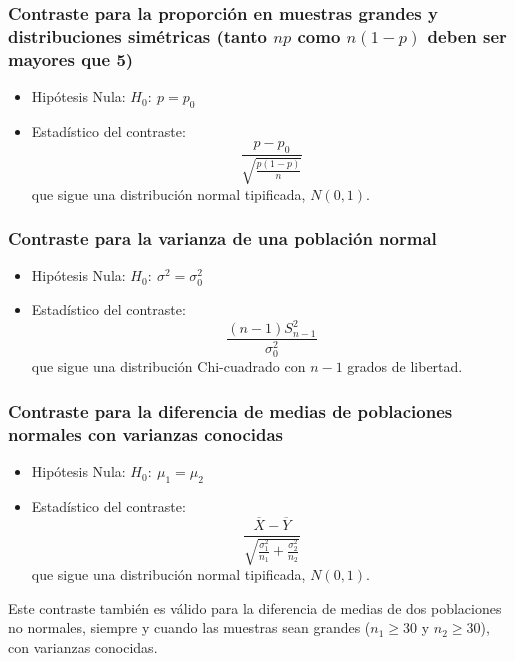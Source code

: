 \subsubsection{Contraste para la proporción en muestras grandes y distribuciones simétricas (tanto $np$ como $n(1-p)$
deben ser mayores que 5)}
\begin{itemize}
\item Hipótesis Nula: $H_0:\ p=p_0$
\item Estadístico del contraste:
\[
\frac{{p - p_0 }}{{\sqrt {\frac{{p\left( {1 - p} \right)}}{n}} }}
\]
que sigue una distribución normal tipificada, $N(0,1)$.
\end{itemize}


\subsubsection{Contraste para la varianza de una población normal}
\begin{itemize}
\item Hipótesis Nula: $H_0:\ \sigma^2=\sigma_0^2$
\item Estadístico del contraste:
\[
\frac{{\left( {n - 1} \right)S_{n - 1} ^2 }}{{\sigma _0 ^2 }}
\]
que sigue una distribución Chi-cuadrado con $n-1$ grados de libertad.
\end{itemize}

\subsubsection{Contraste para la diferencia de medias de poblaciones normales con varianzas conocidas}
\begin{itemize}
\item Hipótesis Nula: $H_0:\ \mu_1=\mu_2$
\item Estadístico del contraste:
\[
\frac{{\overline X  - \overline Y }}{{\sqrt {\frac{{\sigma _1 ^2}}{{n_1 }} + \frac{{\sigma _2 ^2 }}{{n_2 }}} }}
\]
que sigue una distribución normal tipificada, $N(0,1)$.
\end{itemize}
Este contraste también es válido para la diferencia de medias de dos poblaciones no normales, siempre y cuando las
muestras sean grandes ($n_1\geq 30$ y $n_2\geq 30$), con varianzas conocidas.

